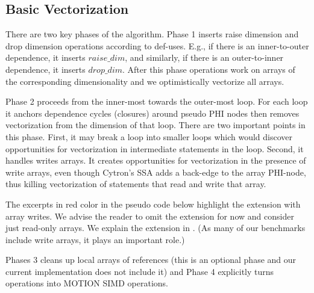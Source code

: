 \subsection{Basic Vectorization}
\label{sec:basic_vectorization}


There are two key phases of the algorithm. Phase 1 inserts raise dimension and drop dimension 
operations according to def-uses. E.g., if there is an inner-to-outer dependence, it inserts $\mathit{raise\_dim}$,
and similarly, if there is an outer-to-inner dependence, it inserts $\mathit{drop\_dim}$. After this phase operations work
on arrays of the corresponding dimensionality and we optimistically vectorize all arrays.

Phase 2 proceeds from the inner-most towards the outer-most loop. For each loop it anchors dependence cycles (closures) 
around pseudo PHI nodes then removes vectorization from the dimension of that loop. There are two important points in this 
phase. First, it may break a loop into smaller loops which would discover opportunities 
for vectorization in intermediate statements in the loop. Second, it handles writes arrays. 
It creates opportunities for vectorization in the presence of write arrays, even though 
Cytron's SSA adds a back-edge to the array PHI-node, thus killing vectorization of statements
that read and write that array.

The excerpts in {\color{red} red} color in the pseudo code below highlight the extension 
with array writes. We advise the reader to omit the extension for now and consider just read-only
arrays. We explain the extension in . 
(As many of our benchmarks include write arrays, it plays an important role.)


Phases 3 cleans up local arrays of references (this is an optional phase and our current implementation does not include it)
and Phase 4 explicitly turns operations into MOTION SIMD operations.

